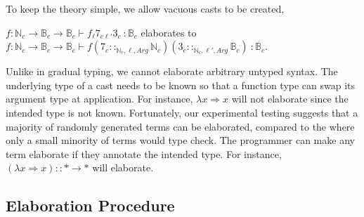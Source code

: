 To keep the theory simple, we allow vacuous casts to be created,
\begin{example}
$f:\mathbb{N}_c \rightarrow\mathbb{B}_c \rightarrow\mathbb{B}_c \vdash f_{\ell}7_{c\ell'}3_c \ :\mathbb{B}_c $ elaborates to $f:\mathbb{N}_c \rightarrow\mathbb{B}_c \rightarrow\mathbb{B}_c \vdash f\left(7_c ::_{\mathbb{N}_c,\ell,Arg}\mathbb{N}_c \right)\left(3_c ::_{\mathbb{N}_c,\ell',Arg}\mathbb{B}_c \right)\ :\mathbb{B}_c$.
\end{example}


Unlike in gradual typing, we cannot elaborate arbitrary untyped syntax.
The underlying type of a cast needs to be known so that a function type can swap its argument type at application.
For instance, $\lambda x\Rightarrow x$ will not elaborate since the intended type is not known.
Fortunately, our experimental testing suggests that a majority of randomly generated terms can be elaborated, compared to the \slang{} where only a small minority of terms would type check.
The programmer can make any term elaborate if they annotate the intended type.
For instance, $\left(\lambda x\Rightarrow x\right)::*\rightarrow*$ will elaborate.

\subsection{Elaboration Procedure}

